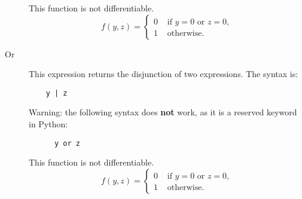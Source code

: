 \documentclass[12pt,a4paper]{article}
\begin{document}
\begin{description}
    This function is not differentiable.
    \[
    f(y, z) = \left\{
    \begin{aligned}
      0 & \text{ if } y = 0 \text{ or } z = 0, \\
      1 & \text{ otherwise.}
    \end{aligned}
    \right.
    \]
\item[Or]   This expression returns the disjunction of two expressions. The syntax is:
    \begin{lstlisting}
    y | z 
    \end{lstlisting}
    Warning: the following syntax does \textbf{not} work, as it is a reserved keyword in Python:
    \begin{lstlisting}
      y or z 
    \end{lstlisting}
    
    This function is not differentiable.
    \[
    f(y, z) = \left\{
    \begin{aligned}
      0 & \text{ if } y = 0 \text{ or } z = 0, \\
      1 & \text{ otherwise.}
    \end{aligned}
    \right.
    \]
  \end{description}
\end{document}
